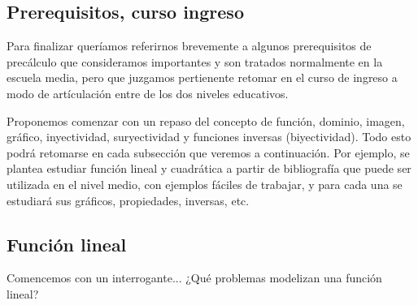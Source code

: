 \documentclass[a4paper,10pt,BCOR10mm,oneside,headsepline]{scrbook}
\begin{document}
\subsection{Prerequisitos, curso ingreso}

Para finalizar  queríamos referirnos brevemente a algunos prerequisitos de precálculo que consideramos importantes y son tratados normalmente en la escuela media, pero que juzgamos  pertienente retomar en el curso de ingreso a modo de artículación entre de los dos niveles educativos.  

Proponemos comenzar con un repaso del concepto de función, dominio, imagen, gráfico, inyectividad, suryectividad y funciones inversas (biyectividad). Todo esto podrá retomarse en cada subsección que veremos a continuación. Por ejemplo, se plantea estudiar función lineal y cuadrática a partir de bibliografía que puede ser utilizada en el nivel medio, con ejemplos fáciles de trabajar, y para cada una se estudiará sus gráficos, propiedades, inversas, etc. 

\subsection{Función lineal}

Comencemos con un interrogante... ¿Qué problemas modelizan una función lineal?
\end{document}
